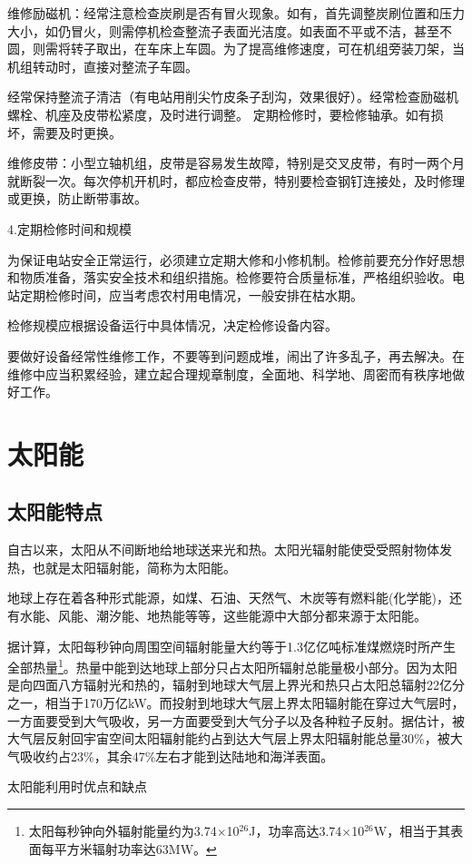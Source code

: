 \documentclass{ctexbook}
\begin{document}
维修励磁机：经常注意检查炭刷是否有冒火现象。如有，首先调整炭刷位置和压力大小，如仍冒火，则需停机检查整流子表面光洁度。如表面不平或不洁，甚至不圆，则需将转子取出，在车床上车圆。为了提高维修速度，可在机组旁装刀架，当机组转动时，直接对整流子车圆。

经常保持整流子清洁（有电站用削尖竹皮条子刮沟，效果很好）。经常检查励磁机螺栓、机座及皮带松紧度，及时进行调整。
定期检修时，要检修轴承。如有损坏，需要及时更换。

维修皮带：小型立轴机组，皮带是容易发生故障，特别是交叉皮带，有时一两个月就断裂一次。每次停机开机时，都应检查皮带，特别要检查钢钉连接处，及时修理或更换，防止断带事故。

4.定期检修时间和规模

为保证电站安全正常运行，必须建立定期大修和小修机制。检修前要充分作好思想和物质准备，落实安全技术和组织措施。检修要符合质量标准，严格组织验收。电站定期检修时间，应当考虑农村用电情况，一般安排在枯水期。

检修规模应根据设备运行中具体情况，决定检修设备内容。

要做好设备经常性维修工作，不要等到问题成堆，闹出了许多乱子，再去解决。在维修中应当积累经验，建立起合理规章制度，全面地、科学地、周密而有秩序地做好工作。
\section{太阳能}
\subsection{太阳能特点}
自古以来，太阳从不间断地给地球送来光和热。太阳光辐射能使受受照射物体发热，也就是太阳辐射能，简称为太阳能。

地球上存在着各种形式能源，如煤、石油、天然气、木炭等有燃料能(化学能)，还有水能、风能、潮汐能、地热能等等，这些能源中大部分都来源于太阳能。

据计算，太阳每秒钟向周围空间辐射能量大约等于1.3亿亿吨标准煤燃烧时所产生全部热量\footnote{太阳每秒钟向外辐射能量约为3.74$\times$10$^{26}$J，功率高达3.74$\times$10$^{26}$W，相当于其表面每平方米辐射功率达63MW。}。热量中能到达地球上部分只占太阳所辐射总能量极小部分。因为太阳是向四面八方辐射光和热的，辐射到地球大气层上界光和热只占太阳总辐射22亿分之一，相当于170万亿kW。而投射到地球大气层上界太阳辐射能在穿过大气层时，一方面要受到大气吸收，另一方面要受到大气分子以及各种粒子反射。据估计，被大气层反射回宇宙空间太阳辐射能约占到达大气层上界太阳辐射能总量30\%，被大气吸收约占23\%，其余47\%左右才能到达陆地和海洋表面。

太阳能利用时优点和缺点
\end{document}
